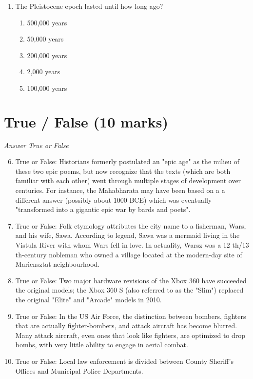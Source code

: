 \documentclass[12pt]{article}
\begin{document}
\begin{enumerate}[label=\arabic*.]
\begin{enumerate}[label=(\alph*)]
    \item 17 th century.
    \item 14 th century.
    \item 18 th century.
    \item 21 st century.
    \item 5 th century.
\end{enumerate}
\item The Pleistocene epoch lasted until how long ago?
\begin{enumerate}[label=(\alph*)]
    \item 500,000 years
    \item 50,000 years
    \item 200,000 years
    \item 2,000 years
    \item 100,000 years
\end{enumerate}
\end{enumerate}

\section*{True / False (10 marks)}
\textit{Answer True or False}
\begin{enumerate}[label=\arabic*.]
\setcounter{enumi}{5}
\item True or False: Historians formerly postulated an "epic age" as the milieu of these two epic poems, but now recognize that the texts (which are both familiar with each other) went through multiple stages of development over centuries. For instance, the Mahabharata may have been based on a a different answer (possibly about 1000 BCE) which was eventually "transformed into a gigantic epic war by bards and poets".
\item True or False: Folk etymology attributes the city name to a fisherman, Wars, and his wife, Sawa. According to legend, Sawa was a mermaid living in the Vistula River with whom Wars fell in love. In actuality, Warsz was a 12 th/13 th-century nobleman who owned a village located at the modern-day site of Mariensztat neighbourhood.
\item True or False: Two major hardware revisions of the Xbox 360 have succeeded the original models; the Xbox 360 S (also referred to as the "Slim") replaced the original "Elite" and "Arcade" models in 2010.
\item True or False: In the US Air Force, the distinction between bombers, fighters that are actually fighter-bombers, and attack aircraft has become blurred. Many attack aircraft, even ones that look like fighters, are optimized to drop bombs, with very little ability to engage in aerial combat.
\item True or False: Local law enforcement is divided between County Sheriff's Offices and Municipal Police Departments.
\end{enumerate}
\end{document}
